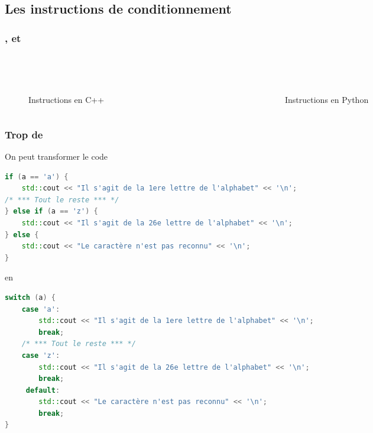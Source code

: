 \documentclass{cppcourses}
\begin{document}
\subsection{Les instructions de conditionnement}

\begin{frame}

\frametitle{,  et }

\begin{columns}
    \begin{column}{0.5\textwidth}
        \begin{figure}
 \\
 \\
\caption{Instructions en C++}
        \end{figure}
    \end{column}
    \begin{column}{0.5\textwidth}
        \begin{figure}
 \\
 \\
\caption{Instructions en Python}
        \end{figure}
    \end{column}
\end{columns}


\end{frame}

\begin{frame}[fragile]

\frametitle{Trop de }

On peut transformer le code

\begin{lstlisting}[language = c++]
if (a == 'a') {
    std::cout << "Il s'agit de la 1ere lettre de l'alphabet" << '\n';
/* *** Tout le reste *** */
} else if (a == 'z') {
    std::cout << "Il s'agit de la 26e lettre de l'alphabet" << '\n';
} else {
    std::cout << "Le caractère n'est pas reconnu" << '\n';
}
\end{lstlisting}

en

\begin{lstlisting}[language = c++]
switch (a) {
    case 'a':
        std::cout << "Il s'agit de la 1ere lettre de l'alphabet" << '\n';
        break;
    /* *** Tout le reste *** */
    case 'z':
        std::cout << "Il s'agit de la 26e lettre de l'alphabet" << '\n';
        break;
     default:
        std::cout << "Le caractère n'est pas reconnu" << '\n';
        break;
}
\end{lstlisting}

\end{frame}
\end{document}
